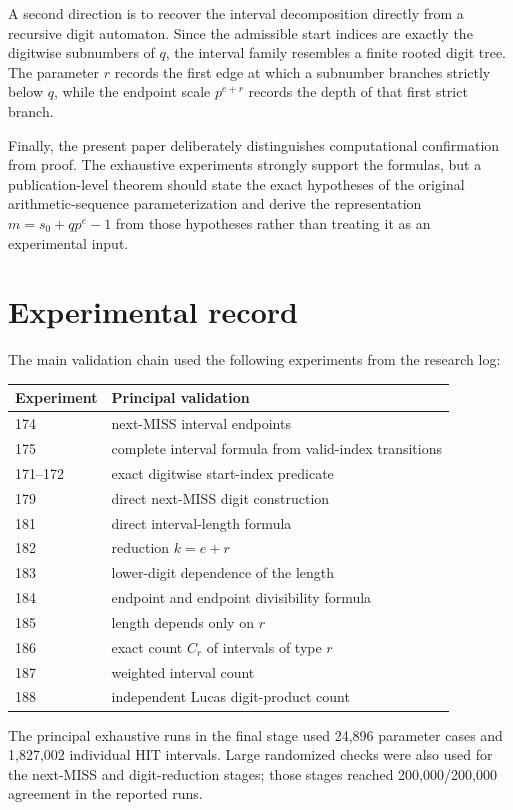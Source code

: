 \documentclass[11pt,a4paper]{article}
\theoremstyle{definition}
\theoremstyle{remark}
\begin{document}
A second direction is to recover the interval decomposition directly from a recursive digit automaton.  Since the admissible start indices are exactly the digitwise subnumbers of $q$, the interval family resembles a finite rooted digit tree.  The parameter $r$ records the first edge at which a subnumber branches strictly below $q$, while the endpoint scale $p^{e+r}$ records the depth of that first strict branch.

Finally, the present paper deliberately distinguishes computational confirmation from proof.  The exhaustive experiments strongly support the formulas, but a publication-level theorem should state the exact hypotheses of the original arithmetic-sequence parameterization and derive the representation $m=s_0+qp^e-1$ from those hypotheses rather than treating it as an experimental input.

\section{Experimental record}

The main validation chain used the following experiments from the research log:
\begin{center}
\begin{tabular}{@{}ll@{}}
\toprule
Experiment & Principal validation \\
\midrule
174 & next-MISS interval endpoints \\
175 & complete interval formula from valid-index transitions \\
171--172 & exact digitwise start-index predicate \\
179 & direct next-MISS digit construction \\
181 & direct interval-length formula \\
182 & reduction $k=e+r$ \\
183 & lower-digit dependence of the length \\
184 & endpoint and endpoint divisibility formula \\
185 & length depends only on $r$ \\
186 & exact count $C_r$ of intervals of type $r$ \\
187 & weighted interval count \\
188 & independent Lucas digit-product count \\
\bottomrule
\end{tabular}
\end{center}

The principal exhaustive runs in the final stage used 24,896 parameter cases and 1,827,002 individual HIT intervals.  Large randomized checks were also used for the next-MISS and digit-reduction stages; those stages reached 200,000/200,000 agreement in the reported runs.
\end{document}
